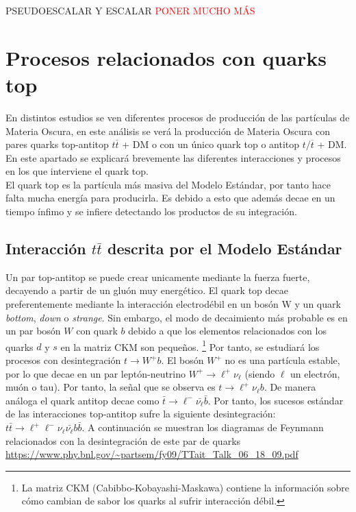 PSEUDOESCALAR Y ESCALAR
 \textcolor{red}{PONER MUCHO MÁS} 

\section{Procesos relacionados con quarks top}

En distintos estudios se ven diferentes procesos de producción de las partículas de Materia Oscura, en este análisis se verá la producción de Materia Oscura con pares quarks top-antitop $t\overline{t}$ + DM o con un único quark top o antitop $t/\overline{t} $ + DM. En este apartado se explicará brevemente las diferentes interacciones y procesos en los que interviene el quark top.\\

El quark top es la partícula más masiva del Modelo Estándar, por tanto hace falta mucha energía para producirla. Es debido a esto que además decae en un tiempo ínfimo y se infiere detectando los productos de su integración.

\subsection{Interacción $t\bar{t}$ descrita por el Modelo Estándar}

Un par top-antitop se puede crear unicamente mediante la fuerza fuerte, decayendo a partir de un gluón muy energético. El quark top decae preferentemente mediante la interacción electrodébil en un bosón W y un quark \textit{bottom}, \textit{down} o \textit{strange}. Sin embargo, el modo de decaimiento más probable es en un par bosón $W$ con quark $b$ debido a que los elementos relacionados con los quarks $d$ y $s$ en la matriz CKM son pequeños. \footnote{La matriz CKM (Cabibbo-Kobayashi-Maskawa) contiene la información sobre cómo cambian de sabor los quarks al sufrir interacción débil.} Por tanto, se estudiará los procesos con desintegración $t \rightarrow W^+b $. El bosón $W^+$ no es una partícula estable, por lo que decae en un par leptón-neutrino $W^+ \rightarrow \ell^+ \nu_\ell$ (siendo $\ell$ un electrón, muón o tau). Por tanto, la señal que se observa es $t \rightarrow \ell^+\nu_\ell b$. De manera análoga el quark antitop decae como $\bar{t} \rightarrow \ell^- \bar{\nu_\ell}\bar{b}$. Por tanto, los sucesos estándar de las interacciones top-antitop sufre la siguiente desintegración: $t\bar{t} \rightarrow \ell^+  \ell^- \nu_{\ell} \bar{\nu_\ell} b \bar{b}$. \cite{topdecays} A continuación se muestran los diagramas de Feynmann relacionados con la desintegración de este par de quarks
\url{https://www.phy.bnl.gov/~partsem/fy09/TTait_Talk_06_18_09.pdf}

